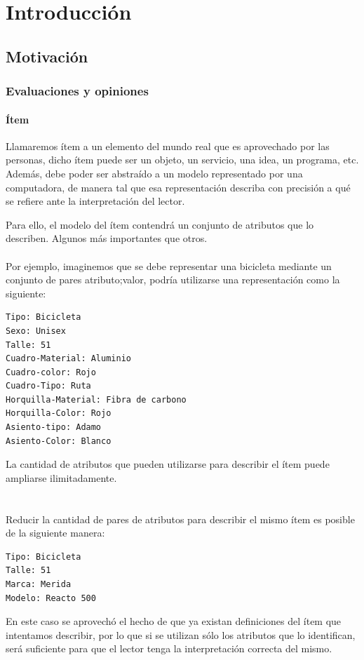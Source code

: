 \part{Introducción}

\chapter{Motivación}
\label{chapter:introduccion}

\section{Evaluaciones y opiniones}
\label{section:evaluaciones-cruzadas}

\subsection{Ítem}
\noindent Llamaremos ítem a un elemento del mundo real que es aprovechado por las personas, dicho ítem puede ser un objeto, un servicio, una idea, un programa, etc. Además, debe poder ser abstraído a un modelo representado por una computadora, de manera tal que esa representación describa con precisión a qué se refiere ante la interpretación del lector. 

\noindent Para ello, el modelo del ítem contendrá un conjunto de atributos que lo describen. Algunos más importantes que otros.
\\\\
Por ejemplo, imaginemos que se debe representar una bicicleta mediante un conjunto de pares atributo;valor, podría utilizarse una representación como la siguiente:
\begin{lstlisting}[frame=single] 
Tipo: Bicicleta
Sexo: Unisex
Talle: 51
Cuadro-Material: Aluminio
Cuadro-color: Rojo
Cuadro-Tipo: Ruta
Horquilla-Material: Fibra de carbono
Horquilla-Color: Rojo
Asiento-tipo: Adamo 
Asiento-Color: Blanco
\end{lstlisting}
La cantidad de atributos que pueden utilizarse para describir el ítem puede ampliarse ilimitadamente. 
\\\\\\
Reducir la cantidad de pares de atributos para describir el mismo ítem es posible de la siguiente manera: 
\begin{lstlisting}[frame=single] 
Tipo: Bicicleta
Talle: 51 
Marca: Merida
Modelo: Reacto 500
\end{lstlisting}
En este caso se aprovechó el hecho de que ya existan definiciones del ítem que intentamos describir, por lo que si se utilizan sólo los atributos que lo identifican, será suficiente para que el lector tenga la interpretación correcta del mismo. 
\\\\
